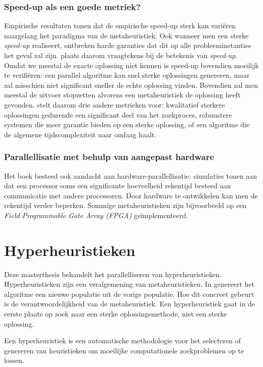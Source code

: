 \subsubsection{Speed-up als een goede metriek?}
Empirische resultaten tonen dat de empirische speed-up sterk kan vari\"eren naargelang het paradigma van de metaheuristiek. Ook wanneer men een sterke \emph{speed-up} realiseert, ontbreken harde garanties dat dit op alle probleeminstanties het geval zal zijn. \cite{crainicAndToulouse} plaats daarom vraagtekens bij de betekenis van \emph{speed-up}. Omdat we meestal de exacte oplossing niet kennen is speed-up bovendien moeilijk te verifi\"eren: een parallel algoritme kan snel sterke oplossingen genereren, maar zal misschien niet significant sneller de echte oplossing vinden. Bovendien zal men meestal de uitvoer stopzetten alvorens een metaheuristiek de oplossing heeft gevonden. \cite{crainicAndToulouse} stelt daarom drie andere metrieken voor: kwalitatief sterkere oplossingen gedurende een significant deel van het zoekproces, robuustere systemen die meer garantie bieden op een sterke oplossing, of een algoritme die de algemene tijdscomplexiteit naar omlaag haalt.

\subsubsection{Parallellisatie met behulp van aangepast hardware}
Het boek besteed ook aandacht aan hardware-parallellisatie: simulaties tonen aan dat een processor soms een significante hoeveelheid rekentijd besteed aan communicatie met andere processoren. Door hardware te ontwikkelen kan men de rekentijd verder beperken. Sommige metaheuristieken zijn bijvoorbeeld op een \emph{Field Programmable Gate Array (FPGA)} ge\"implementeerd\cite{conf/glvlsi/HaldarNCB00,conf/fpt/GuntschMSDESS02,journals/gpem/Martin01}.

\section{Hyperheuristieken}

Deze masterthesis behandelt het parallelliseren van hyperheuristieken. Hyperheuristieken zijn een veralgemening van metaheuristieken. In  genereert het algoritme een nieuwe populatie uit de vorige populatie. Hoe dit concreet gebeurt is de verantwoordelijkheid van de metaheuristiek. Een hyperheuristiek gaat in de eerste plaats op zoek naar een sterke oplossingsmethode, niet een sterke oplossing\cite{Burke_aclassification}.
\begin{definition}
Een hyperheuristiek is een automatische methodologie voor het selecteren of genereren van heuristieken om moeilijke computationele zoekproblemen op te lossen.
\end{definition}

